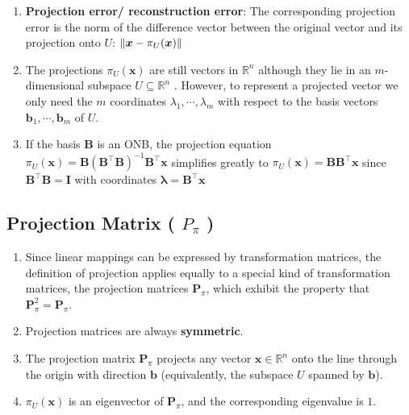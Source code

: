 \begin{enumerate}
    \item \textbf{Projection error/ reconstruction error}: The corresponding projection error is the norm of the difference vector between the original vector and its projection onto $U$: 
    $
        \left\| \bm{x} - \pi_U(\bm{x}) \right\|
    $
    \hfill \cite{mfml/book/mml/Deisenroth-Faisal-Ong}

    \item The projections $\pi_U (\bm{x})$ are still vectors in $\mathbb{R}^n$ although they lie in an $m$-dimensional subspace $U \subseteq \mathbb{R}^n$ . 
    However, to represent a projected vector we only need the $m$ coordinates $\lambda_1, \cdots , \lambda_m$ with respect to the basis vectors $\bm{b}_1, \cdots , \bm{b}_m$ of $U$.
    \hfill \cite{mfml/book/mml/Deisenroth-Faisal-Ong}

    \item If the basis $\bm{B}$ is an ONB, the projection equation 
    $
        \pi_U (\bm{x}) 
        = \bm{B} (\bm{B}^\top \bm{B})^{-1} \bm{B}^\top \bm{x}
    $
    simplifies greatly to $ \pi_U (\bm{x}) = \bm{B}\bm{B}^\top \bm{x}$ since $\bm{B}^\top \bm{B} = \bm{I}$ with coordinates $\bm{\lambda} = \bm{B}^\top \bm{x} $
\end{enumerate}



\subsection{Projection Matrix ( $P_\pi$ )}

\begin{enumerate}
    \item Since linear mappings can be expressed by transformation matrices, the definition of projection applies equally to a special kind  of transformation matrices, the projection matrices $\bm{P}_\pi$, which exhibit the property that $\bm{P}^2_\pi = \bm{P}_\pi$.
    \hfill \cite{mfml/book/mml/Deisenroth-Faisal-Ong}

    \item Projection matrices are always \textbf{symmetric}.
    \hfill \cite{mfml/book/mml/Deisenroth-Faisal-Ong}

    \item The projection matrix $\bm{P}_ \pi$ projects any vector $\bm{x} \in \mathbb{R}^n$ onto the line through the origin with direction $\bm{b}$ (equivalently, the subspace $U$ spanned by $\bm{b}$).
    \hfill \cite{mfml/book/mml/Deisenroth-Faisal-Ong}

    \item $\pi_U (\bm{x})$ is an eigenvector of $\bm{P}_\pi$, and the corresponding eigenvalue is $1$.
    \hfill \cite{mfml/book/mml/Deisenroth-Faisal-Ong}
\end{enumerate}



